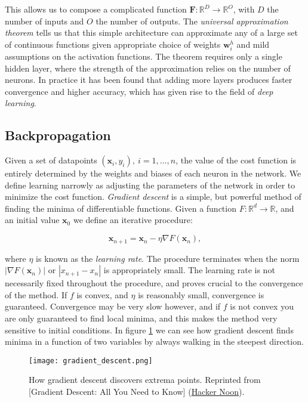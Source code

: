 This allows us to compose a complicated function $\bm{F}: \mathbb{R}^D \rightarrow
\mathbb{R}^O$, with $D$ the number of inputs and $O$ the number of outputs.
The \textit{universal approximation theorem} tells us that this simple architecture
can approximate any of a large set of continuous functions
given appropriate choice of weights $\bm{w}_i^h$ and mild assumptions
on the activation functions. The theorem requires only a single hidden layer,
where the strength of the approximation relies on the number of neurons.
In practice it has been found that adding more layers produces
faster convergence and higher accuracy, which has given rise
to the field of \textit{deep learning}.

\subsection{Backpropagation}
Given a set of datapoints $(\bm{x}_i, y_i), \ i=1,\dots,n$,
the value of the cost function is entirely determined
by the weights and biases of each neuron in the network.
We define learning narrowly as adjusting the parameters of the network
in order to minimize the cost function.
\textit{Gradient descent} is a simple, but powerful method
of finding the minima of differentiable functions.
Given a function $F: \mathbb{R}^d \rightarrow \mathbb{R}$, and an initial
value $\bm{x}_0$ we define an iterative procedure:

\begin{equation}
 \bm{x}_{n+1} = \bm{x}_{n} - \eta \nabla F(\bm{x}_n), 
\end{equation}

where $\eta$ is known as the \textit{learning rate}.
The procedure terminates when the norm
$ \left| \nabla F(\bm{x}_n) \right| $ or
$ \left| x_{n+1} - x_{n} \right| $
is appropriately small.
The learning rate is not necessarily fixed throughout the procedure,
and proves crucial to the convergence of the method. If $f$
is convex, and $\eta$ is reasonably small, convergence is guaranteed.
Convergence may be very slow however, and if $f$ is not convex
you are only guaranteed to find local minima, and this makes
the method very sensitive to initial conditions.
In figure \ref{fig:gradient-descent} we can see how gradient
descent finds minima in a function of two variables by always walking
in the steepest direction.

\begin{figure}
    \centering
    \texttt{[image: gradient\_descent.png]}
    \caption{How gradient descent discovers extrema points.
    Reprinted from [Gradient Descent: All You Need to Know] (\href{
        https://hackernoon.com/gradient-descent-aynk-7cbe95a778da}{Hacker Noon}).}
    \label{fig:gradient-descent}
\end{figure}

